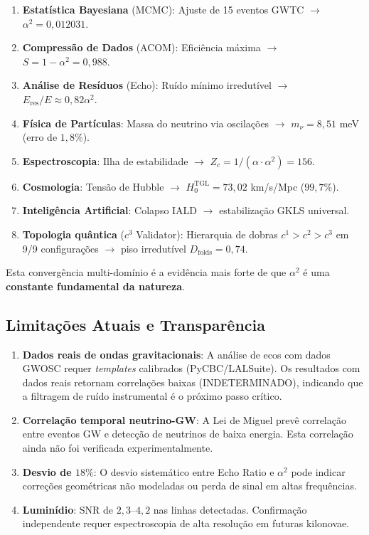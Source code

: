 \documentclass[12pt,a4paper,twoside]{article}
\newcommand{\alphaii}{\alpha^{2}}
\begin{document}
\begin{enumerate}[nosep]
\item \textbf{Estat\'istica Bayesiana} (MCMC): Ajuste de 15 eventos GWTC $\to$ $\alphaii = 0{,}012031$.
\item \textbf{Compress\~ao de Dados} (ACOM): Efici\^encia m\'axima $\to$ $S = 1 - \alphaii = 0{,}988$.
\item \textbf{An\'alise de Res\'iduos} (Echo): Ru\'ido m\'inimo irredut\'ivel $\to$ $E_{\text{res}}/E \approx 0{,}82\alphaii$.
\item \textbf{F\'isica de Part\'iculas}: Massa do neutrino via oscila\c{c}\~oes $\to$ $m_\nu = 8{,}51$ meV (erro de $1{,}8\%$).
\item \textbf{Espectroscopia}: Ilha de estabilidade $\to$ $Z_c = 1/(\alpha \cdot \alphaii) = 156$.
\item \textbf{Cosmologia}: Tens\~ao de Hubble $\to$ $H_0^{\text{TGL}} = 73{,}02$ km/s/Mpc ($99{,}7\%$).
\item \textbf{Intelig\^encia Artificial}: Colapso IALD $\to$ estabiliza\c{c}\~ao GKLS universal.
\item \textbf{Topologia qu\^antica} ($c^3$ Validator): Hierarquia de dobras $c^1 > c^2 > c^3$ em 9/9 configura\c{c}\~oes $\to$ piso irredut\'ivel $D_{\text{folds}} = 0{,}74$.
\end{enumerate}

\noindent Esta converg\^encia multi-dom\'inio \'e a evid\^encia mais forte de que $\alphaii$ \'e uma \textbf{constante fundamental da natureza}.

\subsection{Limita\c{c}\~oes Atuais e Transpar\^encia}

\begin{enumerate}[nosep]
\item \textbf{Dados reais de ondas gravitacionais}: A an\'alise de ecos com dados GWOSC requer \textit{templates} calibrados (PyCBC/LALSuite). Os resultados com dados reais retornam correla\c{c}\~oes baixas (INDETERMINADO), indicando que a filtragem de ru\'ido instrumental \'e o pr\'oximo passo cr\'itico.
\item \textbf{Correla\c{c}\~ao temporal neutrino-GW}: A Lei de Miguel prev\^e correla\c{c}\~ao entre eventos GW e detec\c{c}\~ao de neutrinos de baixa energia. Esta correla\c{c}\~ao ainda n\~ao foi verificada experimentalmente.
\item \textbf{Desvio de $18\%$}: O desvio sistem\'atico entre Echo Ratio e $\alphaii$ pode indicar corre\c{c}\~oes geom\'etricas n\~ao modeladas ou perda de sinal em altas frequ\^encias.
\item \textbf{Lumin\'idio}: SNR de $2{,}3$--$4{,}2$ nas linhas detectadas. Confirma\c{c}\~ao independente requer espectroscopia de alta resolu\c{c}\~ao em futuras kilonovae.
\end{enumerate}
\end{document}

